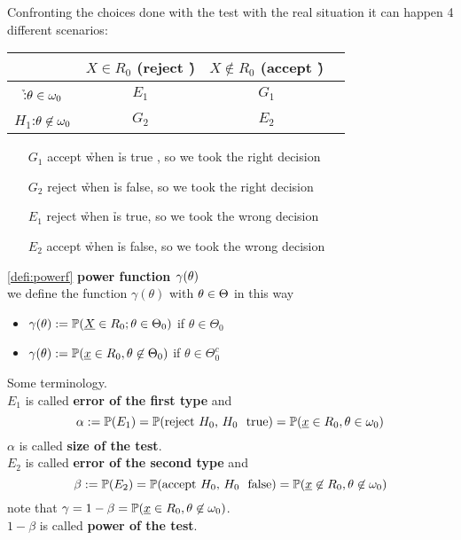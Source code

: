 Confronting the choices done with the test with the real situation it can happen 4 different scenarios:
\begin{center}
	\begin{tabular}{ | c | c | c | c | }
		\hline
		                              & $X\in R_0$ (reject \h)     & $X\not \in R_0$ (accept \h)  \\ \hline
		\h:$\theta \in \omega_0$         & $E_1$          & $G_1$            \\ \hline
		$H_1$:$\theta \not \in \omega_0$ & $G_2$          & $E_2$            \\
		\hline
	\end{tabular}
\end{center}
	\begin{itemize}
		\item[$G_1$] accept \h when \h is true , so we took the right decision 
		\item[$G_2$] reject \h when \h is false, so we took the right decision
		\item[$E_1$] reject \h when \h is true, so we took the wrong decision
		\item[$E_2$] accept \h when \h is false, so we took the wrong decision
	\end{itemize}
\begin{defi}\ref{defi:powerf} \textbf{power function $\gamma(\theta)$}\\
	we define the function $\gamma(\theta) $ with $\theta \in \Theta$ in this way
	\begin{itemize}
		\item $\gamma(\theta):=\mathbb{P}(\underline X \in R_0 ; \theta \in \Theta_0)$   if $\theta \in \Theta_0$
		\item $\gamma(\theta):= \mathbb{P}(\underline x \in R_0, \theta \not \in \Theta_0)$    if $\theta\in \Theta_0^c$
	\end{itemize}
\end{defi}
\begin{defi}Some terminology.\\
	$E_1$ is called \textbf{error of the first type} and  $$\alpha:=\p(E_1)=\p(\text{reject \h, \h \ \ true})=\p(\ux \in R_0 , \theta \in \omega_0)$$ $\alpha$ is called \textbf{size of the test}.\\
	$E_2$ is called \textbf{error of the second type} and $$\beta:=\p(E_2)=\p(\text{accept \h, \h \ \ false})=\p(\ux \not \in R_0 , \theta \not \in \omega_0)$$
	note that $\gamma=1-\beta=\mathbb{P}(\underline x \in R_0, \theta \not \in \omega_0)$.\\$1-\beta$ is called \textbf{power of the test}.
\end{defi}
